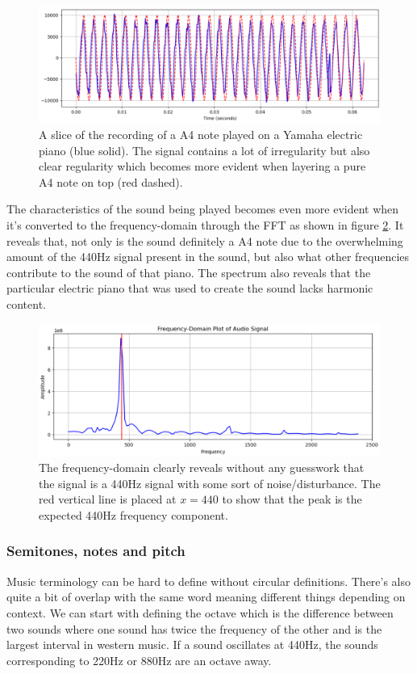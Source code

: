 \begin{figure}[ht]
    \centering
    \includegraphics[width=\textwidth]{./images/piano_wave.png}
    \caption{A slice of the recording of a A4 note played on a Yamaha electric piano (blue solid). The signal contains a lot of irregularity but also clear regularity which becomes more evident when layering a pure A4 note on top (red dashed).\label{fig:pianoWave}}
\end{figure}

The characteristics of the sound being played becomes even more evident when it's converted to the frequency-domain through the FFT as shown in figure \ref{fig:pianoFreq}. It reveals that, not only is the sound definitely a A4 note due to the overwhelming amount of the 440Hz signal present in the sound, but also what other frequencies contribute to the sound of that piano. The spectrum also reveals that the particular electric piano that was used to create the sound lacks harmonic content.

\begin{figure}[ht]
    \centering
    \includegraphics[width=\textwidth]{./images/piano_freq.png}
    \caption{The frequency-domain clearly reveals without any guesswork that the signal is a 440Hz signal with some sort of noise/disturbance. The red vertical line is placed at $x=440$ to show that the peak is the expected 440Hz frequency component.\label{fig:pianoFreq}}
\end{figure}

\subsubsection{Semitones, notes and pitch} 
Music terminology can be hard to define without circular definitions. There's also quite a bit of overlap with the same word meaning different things depending on context. We can start with defining the octave which is the difference between two sounds where one sound has twice the frequency of the other and is the largest interval in western music. If a sound oscillates at 440Hz, the sounds corresponding to 220Hz or 880Hz are an octave away.

